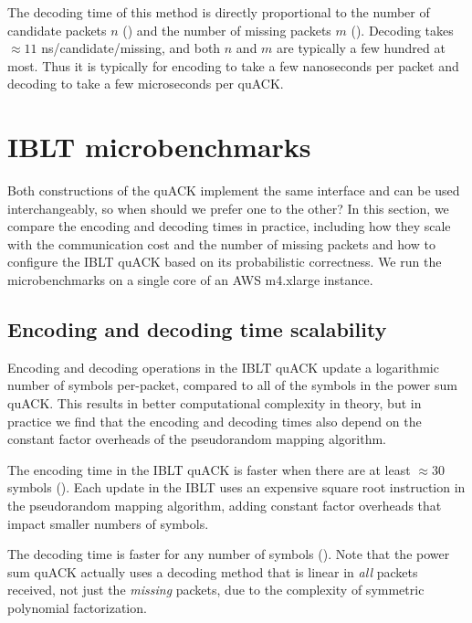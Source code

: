 The decoding time of this method is directly proportional to the number of
candidate packets $n$ ()
and the number of missing packets $m$ ().
Decoding takes $\approx 11$ ns/candidate/missing, and both $n$ and $m$ are
typically a few hundred at most.
Thus it is typically for encoding to take a few nanoseconds per packet and
decoding to take a few microseconds per quACK.

\section{IBLT microbenchmarks}
\label{sec:quack:iblt-microbenchmarks}

Both constructions of the quACK implement the same interface and can be used
interchangeably, so when should we prefer one to the other? In this section, we
compare the encoding and decoding times in practice, including how they scale
with the communication cost and the number of missing packets and how to
configure the IBLT quACK based on its probabilistic correctness. We run the
microbenchmarks on a single core of an AWS m4.xlarge instance.

\subsection{Encoding and decoding time scalability}
\label{sec:quack:iblt-microbenchmarks:scalability}



Encoding and decoding operations in the IBLT quACK update a logarithmic number
of symbols per-packet, compared to all of the symbols in the power sum quACK.
This results in better computational complexity in theory, but in practice we
find that the encoding and decoding times also depend on the constant factor
overheads of the pseudorandom mapping algorithm.

The encoding time in the IBLT quACK is faster when there are at least
$\approx\!30$ symbols ().
Each update in the IBLT uses an expensive square root instruction in the
pseudorandom mapping algorithm, adding constant factor overheads that impact
smaller numbers of symbols.

The decoding time is faster for any number of symbols ().
Note that the power sum quACK actually uses a decoding method that is linear
in \textit{all} packets received, not just the \textit{missing} packets, due to
the complexity of symmetric polynomial factorization.

